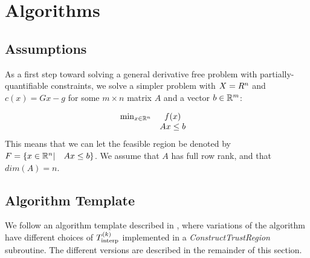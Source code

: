 

\section{Algorithms}

\subsection{Assumptions}

As a first step toward solving a general derivative free problem with partially-quantifiable constraints,
we solve a simpler problem with $X = R^n$ and $c(x) = Gx-g$ for some $m\times n$ matrix $A$ and a vector $b\in \mathbb R^m$:

\[ \begin{array}{ccl} \min_{x \in \mathbb R^n} & f(x) \\
& Ax \le b & 
\end{array}
\]
This means that we can let the feasible region be denoted by ${F} = \{x \in \mathbb R^n | \quad  Ax \le b \}$.
We assume that $A$ has full row rank, and that  $dim(A) = n$.

\subsection{Algorithm Template}

We follow an algorithm template described in \cite{doi:10.1080/10556788.2015.1026968}, where variations of the algorithm have different choices of $ {T_{\text{interp}}^{(k)}} $ implemented in a \emph{ConstructTrustRegion} subroutine.
The different versions are described in the remainder of this section.



